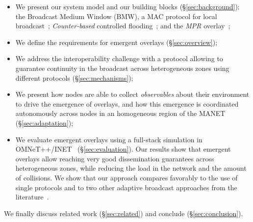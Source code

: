 \begin{itemize}
	\item We present our system model and our building blocks (\S\ref{sec:background}): the Broadcast Medium Window (BMW), a MAC protocol for local broadcast~\cite{tang2001mac}; \emph{Counter-based} controlled flooding~\cite{2001:AAR:876878.879323}; and the \emph{MPR} overlay~\cite{mpr};
	\item We define the requirements for emergent overlays (\S\ref{sec:overview});
	\item We address the interoperability challenge with a protocol allowing to guarantee continuity in the broadcast across heterogeneous zones using different protocols (\S\ref{sec:mechanisms});
	\item We present how nodes are able to collect \emph{observables} about their environment to drive the emergence of overlays, and how this emergence is coordinated autonomously across nodes in an homogeneous region of the MANET (\S\ref{sec:adaptation});
	\item We evaluate emergent overlays using a full-stack simulation in OMNeT++/INET~\cite{omnet} (\S\ref{sec:evaluation}).
	Our results show that emergent overlays allow reaching very good dissemination guarantees across heterogeneous zones, while reducing the load in the network and the amount of collisions.
	We show that our approach compares favorably to the use of single protocols and to two other adaptive broadcast approaches from the literature~\cite{2001:AAR:876878.879323,adaptive_group_com_iscc02}.
\end{itemize}
We finally discuss related work (\S\ref{sec:related}) and conclude (\S\ref{sec:conclusion}).
